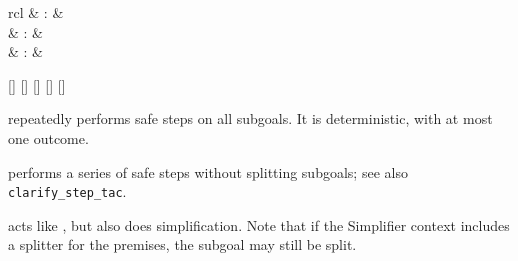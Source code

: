 \begin{isabellebody}
\begin{isamarkuptext}
  \begin{matharray}{rcl}
    \hypertarget{method.safe}{\hyperlink{method.safe}{\mbox{}}} & : &  \\
    \hypertarget{method.clarify}{\hyperlink{method.clarify}{\mbox{}}} & : &  \\
    \hypertarget{method.clarsimp}{\hyperlink{method.clarsimp}{\mbox{}}} & : &  \\
  \end{matharray}

  \begin{railoutput}
\rail@bar
{}[]
[]
\rail@endbar
\rail@plus
{}
[]
\rail@endplus
\rail@end
{}
[]
\rail@plus
{}
[]
\rail@endplus
\rail@end
\end{railoutput}


  \begin{description}

  \item \hyperlink{method.safe}{\mbox{}} repeatedly performs safe steps on all subgoals.
  It is deterministic, with at most one outcome.

  \item \hyperlink{method.clarify}{\mbox{}} performs a series of safe steps without
  splitting subgoals; see also \verb|clarify_step_tac|.

  \item \hyperlink{method.clarsimp}{\mbox{}} acts like \hyperlink{method.clarify}{\mbox{}}, but also does
  simplification.  Note that if the Simplifier context includes a
  splitter for the premises, the subgoal may still be split.


\end{description}
\end{isamarkuptext}
\end{isabellebody}
